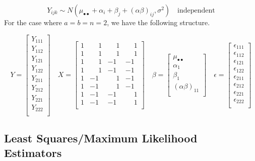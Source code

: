 \documentclass[
]{book}
\begin{document}
\[
Y_{ijk} \sim N\left(\mu_{\bullet\bullet}+\alpha_i+\beta_j+\left(\alpha\beta\right)_{ij},\sigma^2\right) \quad \mbox{independent}
\] For the case where \(a=b=n=2\), we have the following structure.

\[
Y=
\begin{bmatrix}
Y_{111} \\Y_{112}\\ Y_{121}\\Y_{122}\\Y_{211}\\Y_{212}\\Y_{221}\\Y_{222}\\
\end{bmatrix}
\quad
X=
\begin{bmatrix}
1 & \phantom{-}1 & \phantom{-}1 & \phantom{-}1 \\ 
1 & \phantom{-}1 & \phantom{-}1 & \phantom{-}1 \\
1 & \phantom{-}1 & -1 & -1 \\ 1 & \phantom{-}1 & -1 & -1\\
1 & -1 & \phantom{-}1 & -1 \\ 1 & -1 & \phantom{-}1 & -1\\
1 & -1 & -1 & \phantom{-}1 \\ 1 & -1 & -1 & \phantom{-}1\\
\end{bmatrix}
\quad
\beta=
\begin{bmatrix}
\mu_{\bullet\bullet} \\ \alpha_1  \\ \beta_1 \\ (\alpha\beta)_{11}\\
\end{bmatrix}
\quad
\epsilon =
\begin{bmatrix}
\epsilon_{111} \\\epsilon_{112}\\ \epsilon_{121}\\\epsilon_{122}\\
\epsilon_{211}\\\epsilon_{212}\\\epsilon_{221}\\\epsilon_{222}\\
\end{bmatrix}
\]

\subsection{Least Squares/Maximum Likelihood
Estimators}\label{least-squaresmaximum-likelihood-estimators}
\end{document}
